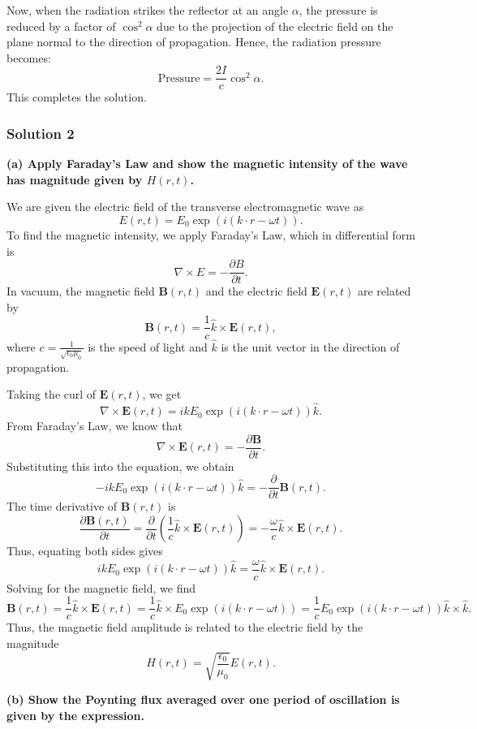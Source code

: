 \documentclass{article}
\begin{document}
Now, when the radiation strikes the reflector at an angle \(\alpha\), the pressure is reduced by a factor of \(\cos^2 \alpha\) due to the projection of the electric field on the plane normal to the direction of propagation. Hence, the radiation pressure becomes:
\[
\text{Pressure} = \frac{2I}{c} \cos^2 \alpha.
\]
This completes the solution.

\subsubsection{Solution 2}
\textbf{(a) Apply Faraday’s Law and show the magnetic intensity of the wave has magnitude given by \(H(r, t)\).}

We are given the electric field of the transverse electromagnetic wave as
\[
E(r, t) = E_0 \exp(i (k \cdot r - \omega t)).
\]
To find the magnetic intensity, we apply Faraday’s Law, which in differential form is
\[
\nabla \times E = -\frac{\partial B}{\partial t}.
\]
In vacuum, the magnetic field \(\mathbf{B}(r, t)\) and the electric field \(\mathbf{E}(r, t)\) are related by
\[
\mathbf{B}(r, t) = \frac{1}{c} \hat{k} \times \mathbf{E}(r, t),
\]
where \(c = \frac{1}{\sqrt{\epsilon_0 \mu_0}}\) is the speed of light and \(\hat{k}\) is the unit vector in the direction of propagation.

Taking the curl of \(\mathbf{E}(r, t)\), we get
\[
\nabla \times \mathbf{E}(r, t) = i k E_0 \exp(i (k \cdot r - \omega t)) \hat{k}.
\]
From Faraday’s Law, we know that
\[
\nabla \times \mathbf{E}(r, t) = -\frac{\partial \mathbf{B}}{\partial t}.
\]
Substituting this into the equation, we obtain
\[
-i k E_0 \exp(i (k \cdot r - \omega t)) \hat{k} = - \frac{\partial}{\partial t} \mathbf{B}(r, t).
\]
The time derivative of \(\mathbf{B}(r, t)\) is
\[
\frac{\partial \mathbf{B}(r, t)}{\partial t} = \frac{\partial}{\partial t} \left( \frac{1}{c} \hat{k} \times \mathbf{E}(r, t) \right) = -\frac{\omega}{c} \hat{k} \times \mathbf{E}(r, t).
\]
Thus, equating both sides gives
\[
i k E_0 \exp(i (k \cdot r - \omega t)) \hat{k} = \frac{\omega}{c} \hat{k} \times \mathbf{E}(r, t).
\]
Solving for the magnetic field, we find
\[
\mathbf{B}(r, t) = \frac{1}{c} \hat{k} \times \mathbf{E}(r, t) = \frac{1}{c} \hat{k} \times E_0 \exp(i (k \cdot r - \omega t)) = \frac{1}{c} E_0 \exp(i (k \cdot r - \omega t)) \hat{k} \times \hat{k}.
\]
Thus, the magnetic field amplitude is related to the electric field by the magnitude
\[
H(r, t) = \sqrt{\frac{\epsilon_0}{\mu_0}} E(r, t).
\]

\textbf{(b) Show the Poynting flux averaged over one period of oscillation is given by the expression.}
\end{document}
